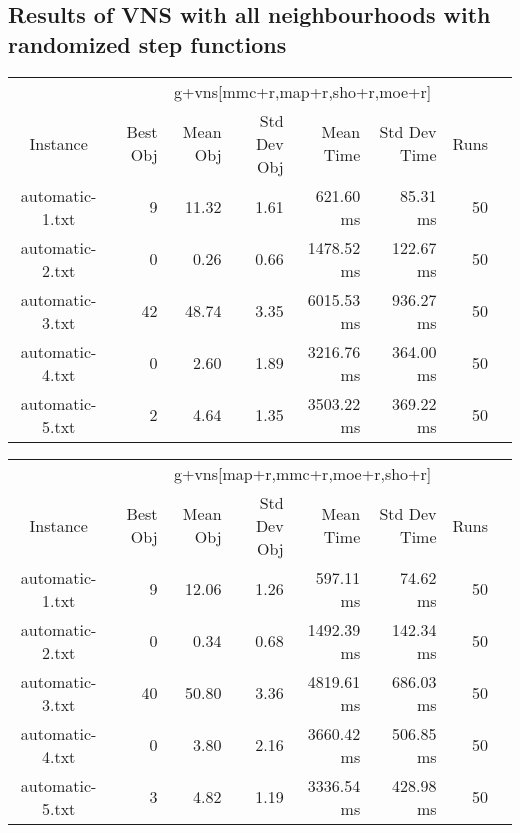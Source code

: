 \documentclass[11pt]{article}
\begin{document}
\subsection{Results of VNS with all neighbourhoods with randomized step functions}
{
\center
\begin{tabular}{c|rrrrrrr}
                & \multicolumn{6}{c}{g+vns[mmc+r,map+r,sho+r,moe+r]}                   \\
Instance        & Best Obj & Mean Obj & Std Dev Obj & Mean Time  & Std Dev Time & Runs \\
\hline
automatic-1.txt & 9        & 11.32    & 1.61        & 621.60 ms  & 85.31 ms     & 50 \\
automatic-2.txt & 0        & 0.26     & 0.66        & 1478.52 ms & 122.67 ms    & 50 \\
automatic-3.txt & 42       & 48.74    & 3.35        & 6015.53 ms & 936.27 ms    & 50 \\
automatic-4.txt & 0        & 2.60     & 1.89        & 3216.76 ms & 364.00 ms    & 50 \\
automatic-5.txt & 2        & 4.64     & 1.35        & 3503.22 ms & 369.22 ms    & 50 \\
\end{tabular}

\begin{tabular}{c|rrrrrrr}
                & \multicolumn{6}{c}{g+vns[map+r,mmc+r,moe+r,sho+r]}                   \\
Instance        & Best Obj & Mean Obj & Std Dev Obj & Mean Time  & Std Dev Time & Runs \\
\hline
automatic-1.txt & 9        & 12.06    & 1.26        & 597.11 ms  & 74.62 ms     & 50 \\
automatic-2.txt & 0        & 0.34     & 0.68        & 1492.39 ms & 142.34 ms    & 50 \\
automatic-3.txt & 40       & 50.80    & 3.36        & 4819.61 ms & 686.03 ms    & 50 \\
automatic-4.txt & 0        & 3.80     & 2.16        & 3660.42 ms & 506.85 ms    & 50 \\
automatic-5.txt & 3        & 4.82     & 1.19        & 3336.54 ms & 428.98 ms    & 50 \\
\end{tabular}

\vspace{0.5cm}

}
\end{document}
